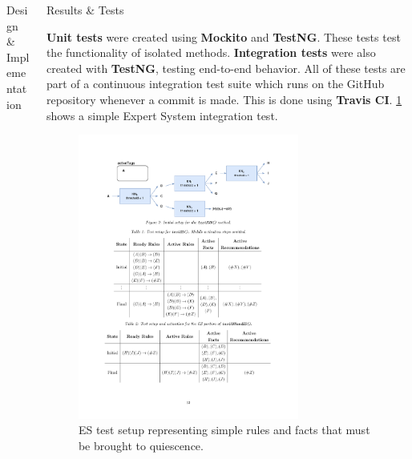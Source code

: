 \documentclass[final]{beamer} %
\newlength{\columnheight}
\begin{document}
\begin{frame}
\begin{columns}
\begin{column}{.33\textwidth}
{\begin{block}{Design \& Implementation}
				\end{block}
				}
			\end{column}
			\begin{column}{.33\textwidth}
				\parbox[t][\columnheight]{\textwidth}{
				\begin{block}{Results \& Tests}
					\parbox{0.99\textwidth}{
						\textbf{Unit tests} were created using \textbf{Mockito} and \textbf{TestNG}. These tests test the functionality of isolated methods. \textbf{Integration tests} were also created with \textbf{TestNG}, testing end-to-end behavior. All of these tests are part of a continuous integration test suite which runs on the GitHub repository whenever a commit is made. This is done using \textbf{Travis CI}. \cref{fig:test_es} shows a simple Expert System integration test.}
					
					\begin{figure}[!htb]
						\centering
						\includegraphics[width=0.7325\textwidth]{figures/testES.pdf}
						\caption
						{ES test setup representing simple rules and facts that must be brought to quiescence.}
						\label{fig:test_es}
					\end{figure}
					

\end{block}}
\end{column}
\end{columns}
\end{frame}
\end{document}
